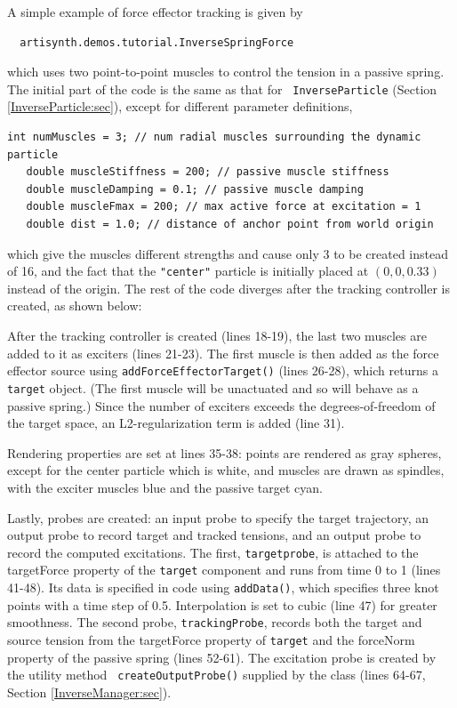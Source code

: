 A simple example of force effector tracking is given by
%
\begin{verbatim}
  artisynth.demos.tutorial.InverseSpringForce
\end{verbatim}
%
which uses two point-to-point muscles to control the tension in a passive
spring. The initial part of the code is the same as that for {\tt
InverseParticle} (Section \ref{InverseParticle:sec}), except for different
parameter definitions,
%
\begin{lstlisting}[]
   int numMuscles = 3; // num radial muscles surrounding the dynamic particle
   double muscleStiffness = 200; // passive muscle stiffness
   double muscleDamping = 0.1; // passive muscle damping
   double muscleFmax = 200; // max active force at excitation = 1   
   double dist = 1.0; // distance of anchor point from world origin
\end{lstlisting}
%
which give the muscles different strengths and cause only 3 to be created
instead of 16, and the fact that the {\tt "center"} particle is initially placed
at $(0, 0, 0.33)$ instead of the origin. The rest of the code diverges after
the tracking controller is created, as shown below:
%
\lstset{numbers=left}
\iflatexml

\else
{}

\fi
\lstset{numbers=none}
%
After the tracking controller is created (lines 18-19), the last two muscles
are added to it as exciters (lines 21-23). The first muscle is then added as
the force effector source using {\tt addForceEffectorTarget()} (lines 26-28),
which returns a {\tt target} object. (The first muscle will be unactuated and
so will behave as a passive spring.) Since the number of exciters exceeds the
degrees-of-freedom of the target space, an L2-regularization term is added
(line 31).

Rendering properties are set at lines 35-38: points are rendered
as gray spheres, except for the center particle which is white,
and muscles are drawn as spindles, with the exciter muscles
blue and the passive target cyan.

Lastly, probes are created: an input probe to specify the target trajectory, an
output probe to record target and tracked tensions, and an output probe to
record the computed excitations. The first, {\tt targetprobe}, is attached to
the {\sf targetForce} property of the {\tt target} component and runs from time
0 to 1 (lines 41-48). Its data is specified in code using {\tt addData()},
which specifies three knot points with a time step of 0.5. Interpolation is set to
cubic (line 47) for greater smoothness. The second probe, {\tt trackingProbe},
records both the target and source tension from the {\sf targetForce} property
of {\tt target} and the {\sf forceNorm} property of the passive spring (lines
52-61). The excitation probe is created by the utility method {\tt
createOutputProbe()} supplied by the  class
(lines 64-67, Section \ref{InverseManager:sec}).


